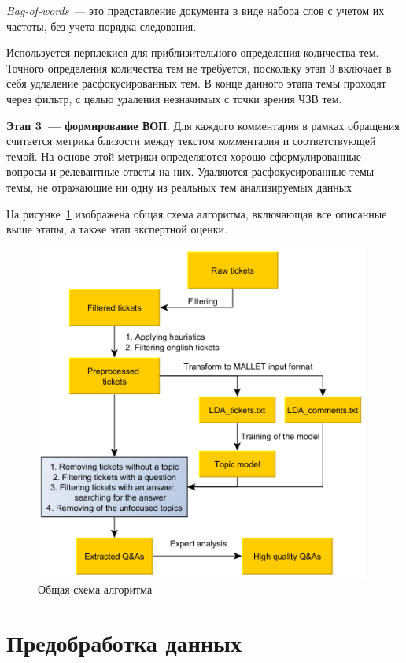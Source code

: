 \textit{Bag-of-words}~--- это представление документа в виде набора слов с учетом их частоты, без учета порядка следования.

Используется перплекися для приблизительного определения количества тем. Точного определения количества тем не требуется, поскольку этап 3 включает в себя удлаление расфокусированных тем. В конце данного этапа темы проходят через фильтр, с целью удаления незначимых с точки зрения ЧЗВ тем.

\textbf{Этап 3~--- формирование ВОП}. Для каждого комментария в рамках обращения считается метрика близости между текстом комментария и соответствующей темой. На основе этой метрики определяются хорошо сформулированные вопросы и релевантные ответы на них. Удаляются расфокусированные темы~--- темы, не отражающие ни одну из реальных тем анализируемых данных

На рисунке~\ref{fig:common_scheme} изображена общая схема алгоритма, включающая все описанные выше этапы, а также этап экспертной оценки.

\begin{figure}[tph!]
\centerline{\includegraphics[width=11cm]{fig/schema2_eng.png}}
    \caption{Общая схема алгоритма}
    \label{fig:common_scheme}
\end{figure}

\section{Предобработка данных}
\label{sec:dev}

